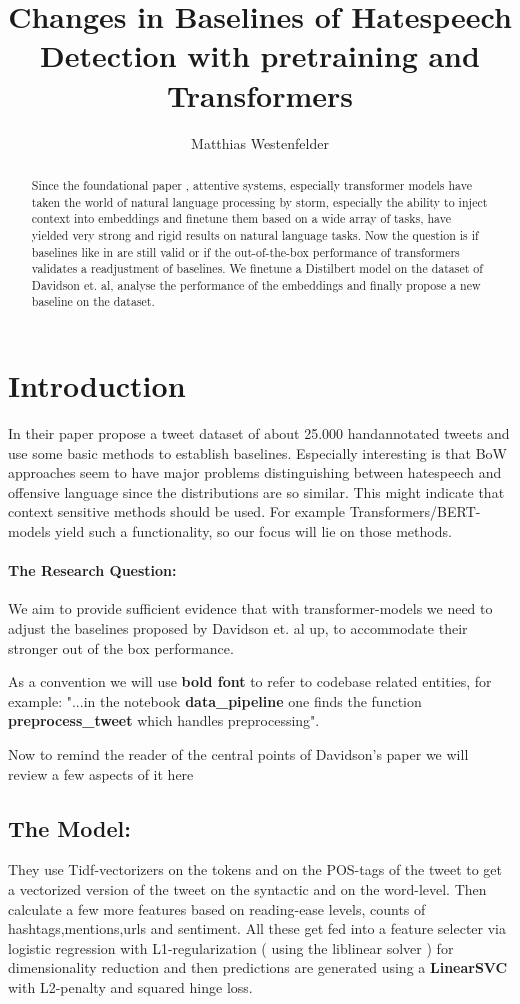 \documentclass[11pt,a4paper]{article}
\title{Changes in Baselines of Hatespeech Detection with pretraining and Transformers}
\author{Matthias Westenfelder}
\begin{document}
\maketitle
\begin{abstract}
  Since the foundational paper \cite{Attention_is_all_you_need}, attentive systems, especially transformer models have 
  taken the world of natural language processing by storm, especially the ability to inject context into embeddings and
  finetune them based on a wide array of tasks, have yielded very strong and rigid results on natural language tasks.
  Now the question is if baselines like in \cite{auto_hatespeech} are still valid or if the out-of-the-box performance of transformers
  validates a readjustment of baselines.
  We finetune a Distilbert model on the dataset of Davidson et. al, analyse the performance of the embeddings
  and finally propose a new baseline on the dataset.
\end{abstract}
 

\section{Introduction}
In their paper \cite{auto_hatespeech} propose a tweet dataset of about 25.000 handannotated tweets and use some basic methods to establish baselines.
Especially interesting is that BoW approaches seem to have major problems distinguishing between hatespeech and offensive language since the distributions are so similar.
This might indicate that context sensitive methods should be used. 
For example Transformers/BERT-models yield such a functionality, so our focus will lie on those methods.

\paragraph{The Research Question:} We aim to provide sufficient evidence that with transformer-models we need to adjust the baselines proposed by Davidson et. al up,
to accommodate their stronger out of the box performance.

As a convention we will use \textbf{bold font} to refer to codebase related entities, for example: 
"...in the notebook \textbf{data\_pipeline} one finds the function \textbf{preprocess\_tweet} which handles preprocessing".

Now to remind the reader of the central points of Davidson's paper we will review a few aspects of it here

\subsection{The Model:}
They use Tidf-vectorizers on the tokens and on the POS-tags of the tweet to get a vectorized 
version of the tweet on the syntactic and on the word-level.
Then calculate a few more features based on reading-ease levels, counts of hashtags,mentions,urls and sentiment.
All these get fed into a feature selecter via logistic regression with L1-regularization ( using the liblinear solver )
for dimensionality reduction and then predictions are generated using a \textbf{LinearSVC} with L2-penalty and squared hinge loss.
\end{document}
